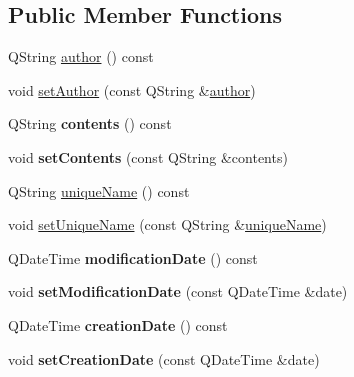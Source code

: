 \subsection*{Public Member Functions}
\begin{DoxyCompactItemize}
\item 
Q\+String \hyperlink{class_poppler_1_1_annotation_aa14606418f3fb5a1ab0a52223c6e1511}{author} () const
\item 
void \hyperlink{class_poppler_1_1_annotation_a519a5f64785bf1381921f6f62dded881}{set\+Author} (const Q\+String \&\hyperlink{class_poppler_1_1_annotation_aa14606418f3fb5a1ab0a52223c6e1511}{author})
\item 
\mbox{\label{class_poppler_1_1_annotation_a46413990e613a73d1e57157268c61eff}} 
Q\+String {\bfseries contents} () const
\item 
\mbox{\label{class_poppler_1_1_annotation_addd60a937680432518eda158dcac894b}} 
void {\bfseries set\+Contents} (const Q\+String \&contents)
\item 
Q\+String \hyperlink{class_poppler_1_1_annotation_ac23456377d420ace54b1f7eb4d389423}{unique\+Name} () const
\item 
void \hyperlink{class_poppler_1_1_annotation_aa2e24fbf5e2cd28af8e1b62876c39663}{set\+Unique\+Name} (const Q\+String \&\hyperlink{class_poppler_1_1_annotation_ac23456377d420ace54b1f7eb4d389423}{unique\+Name})
\item 
\mbox{\label{class_poppler_1_1_annotation_af7b41f7e359ffa61305d36ba72bb8f2e}} 
Q\+Date\+Time {\bfseries modification\+Date} () const
\item 
\mbox{\label{class_poppler_1_1_annotation_a814ec2c7ccc7aace106510a43bcc858e}} 
void {\bfseries set\+Modification\+Date} (const Q\+Date\+Time \&date)
\item 
\mbox{\label{class_poppler_1_1_annotation_ae1f9bc6498d4b30e82755895b1fd10f6}} 
Q\+Date\+Time {\bfseries creation\+Date} () const
\item 
\mbox{\label{class_poppler_1_1_annotation_a9f520b6e61052d40207f8a8959dd9d17}} 
void {\bfseries set\+Creation\+Date} (const Q\+Date\+Time \&date)

\end{DoxyCompactItemize}
